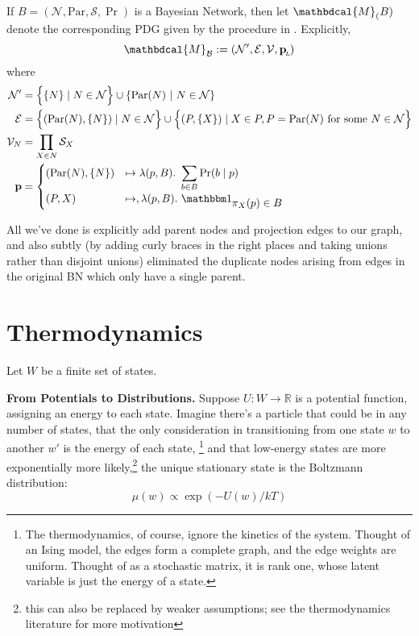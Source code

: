 \documentclass[letterpaper]{article} %
\theoremstyle{plain}
\theoremstyle{definition}
\theoremstyle{remark}
\newcommand\mat[1]{\mathbf{#1}}
\newcommand{\bp}[1][L]{\mat{p}_{\!_{#1}\!}}
\newcommand{\Ed}{\mathcal E}
\newcommand{\dg}[1]{\mathbdcal{#1}}
\newcommand{\PDGof}[1]{{\dg M}_{#1}}
\begin{document}
{\begin{defn} \label{def:bnconvert-formal}
	If $B = (\mathcal N, \mathrm{Par}, \mathcal S, \Pr)$ is a Bayesian Network, then let $\PDGof (B)$ denote the corresponding PDG given by the procedure in . Explicitly, 
	\[ \PDGof{{\mathcal B}} :=  (\mathcal N', \Ed, \mathcal V,
			\bp) \] 
	where %
	\begin{align*}
	\mathcal N' &=  \left\{ \Big.\{N\} \mid N \in \mathcal N\right\} \cup \left\{ \mathrm{Par}(N) ~\middle|~ N \in \cal N \right\} \\%
	\Ed &= \left\{ \vphantom{\Big|}(\mathrm{Par}(N), \{N\}) \mid N \in \mathcal N \right\} \cup 
	\left\{\vphantom{\Big|} (P, \{X\}) \mid X \in P, P = \mathrm{Par}(N) \text{ for some }N \in \mathcal N \right\} \\
	\mathcal V_N &= \prod_{X \in N} \mathcal S_X \\
	\mathbf p &= \begin{cases}
	(\mathrm{Par}(N), \{N\}) &\mapsto \lambda(p, B).~ \displaystyle\sum_{b \in  B} \Pr(b \mid p) \\
	(P, X) &\mapsto, \lambda (p, B).~ \displaystyle \mathbbm 1_{\displaystyle\pi_X(p) \in B}
	\end{cases}
	\end{align*}
\end{defn}
All we've done is explicitly add parent nodes and projection edges to our graph, and also subtly (by adding curly braces in the right places and taking unions rather than disjoint unions) eliminated the duplicate nodes arising from edges in the original BN which only have a single parent.

\section{Thermodynamics}\label{sec:thermo-background}
Let $W$ be a finite set of states.

\textbf{From Potentials to Distributions.}
Suppose $U: W \to \mathbb R$ is a potential function, assigning an energy to each state. Imagine there's a particle that could be in any number of states, that the only consideration in transitioning from one state $w$ to another $w'$ is the energy of each state,%
	\footnote{The thermodynamics, of course, ignore the kinetics of the system. Thought of an Ising model, the edges form a complete graph, and the edge weights are uniform. Thought of as a stochastic matrix, it is rank one, whose latent variable is just the energy of a state.}
and that low-energy states are more exponentially more likely,\footnote{this can also be replaced by weaker assumptions; see the thermodynamics literature for more motivation}
the unique stationary state is the Boltzmann distribution:
\begin{equation}
	 \mu(w) \propto \exp( - U(w) / kT ) \label{eq:boltzmann-appendix}
\end{equation}

}
\end{document}
